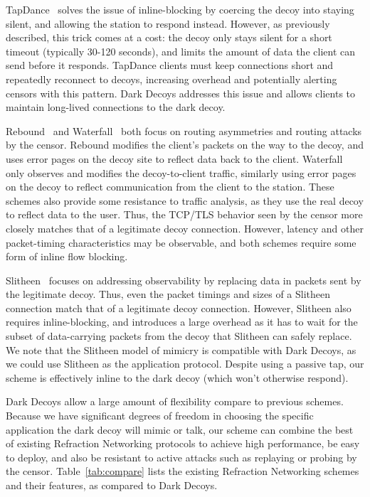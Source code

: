 \documentclass[letterpaper,twocolumn,10pt]{article}
\begin{document}
TapDance~\cite{tapdance} solves the issue of inline-blocking by coercing the
decoy into staying silent, and allowing the station to respond instead. However,
as previously described, this trick comes at a cost: the decoy only stays silent
for a short timeout (typically 30-120 seconds), and limits the amount of data
the client can send before it responds. TapDance clients must keep connections
short and repeatedly reconnect to decoys, increasing overhead and potentially
alerting censors with this pattern. Dark Decoys addresses this issue and allows
clients to maintain long-lived connections to the dark decoy.

Rebound~\cite{rebound} and Waterfall~\cite{waterfall} both focus on routing
asymmetries and routing attacks by the censor. Rebound modifies the client's
packets on the way to the decoy, and uses error pages on the decoy site to
reflect data back to the client. Waterfall only observes and modifies the
decoy-to-client traffic, similarly using error pages on the decoy to reflect
communication from the client to the station. These schemes also provide some
resistance to traffic analysis, as they use the real decoy to reflect data to
the user. Thus, the TCP/TLS behavior seen by the censor more closely matches
that of a legitimate decoy connection. However, latency and other packet-timing
characteristics may be observable, and both schemes require some form of inline
flow blocking.

Slitheen~\cite{slitheen} focuses on addressing observability by replacing
data in packets sent by the legitimate decoy. Thus, even the packet timings and
sizes of a Slitheen connection match that of a legitimate decoy connection.
However, Slitheen also requires inline-blocking, and introduces a large overhead
as it has to wait for the subset of data-carrying packets from the decoy that
Slitheen can safely replace. We note that the Slitheen model of mimicry is
compatible with Dark Decoys, as we could use Slitheen as the application
protocol. Despite using a passive tap, our scheme is effectively inline to the
dark decoy (which won't otherwise respond).

Dark Decoys allow a large amount of flexibility compare to previous schemes.
Because we have significant degrees of freedom in choosing the specific
application the dark decoy will mimic or talk, our scheme can combine the best
of existing Refraction Networking protocols to achieve high performance, be easy
to deploy, and
also be resistant to active attacks such as replaying or probing by the censor.
Table~\ref{tab:compare} lists the existing Refraction Networking schemes and
their features, as compared to Dark Decoys.
\end{document}

